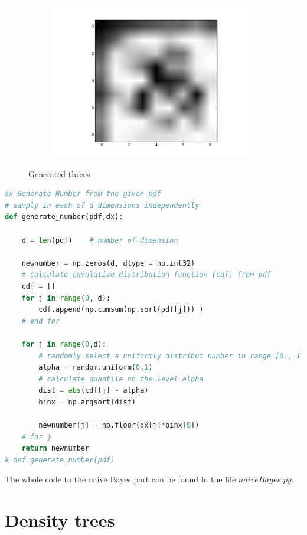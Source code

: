 \documentclass{article}
\begin{document}
\begin{figure}[ht]
\begin{subfigure}[b]{0.5\textwidth}
                \includegraphics[width=\textwidth]{../new3nB_3.png}
        \end{subfigure}        
        \caption{Generated threes}
\end{figure}

\FloatBarrier

\begin{lstlisting}[language=Python]
## Generate Number from the given pdf
# samply in each of d dimensions independently
def generate_number(pdf,dx):
    
    d = len(pdf)    # number of dimension
    
    newnumber = np.zeros(d, dtype = np.int32)
    # calculate cumulative distribution function (cdf) from pdf
    cdf = []
    for j in range(0, d):
        cdf.append(np.cumsum(np.sort(pdf[j])) )
    # end for
        
    for j in range(0,d):
        # randomly select a uniformly distribut number in range [0., 1.)
        alpha = random.uniform(0,1)    
        # calculate quantile on the level alpha
        dist = abs(cdf[j] - alpha)
        binx = np.argsort(dist)
        
        newnumber[j] = np.floor(dx[j]*binx[0])
    # for j    
    return newnumber
# def generate_number(pdf)
\end{lstlisting}

The whole code to the naive Bayes part can be found in the file $naiveBayes.py$.

\section{Density trees}
\end{document}
